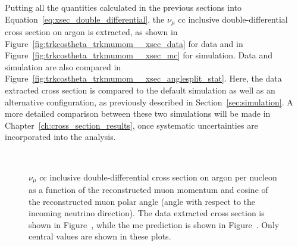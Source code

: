 Putting all the quantities calculated in the previous sections into Equation~\ref{eq:xsec_double_differential}, the $\nu_\mu$ \acrshort{cc} inclusive double-differential cross section on argon is extracted, as shown in Figure~\ref{fig:trkcostheta_trkmumom__xsec_data} for data and in Figure~\ref{fig:trkcostheta_trkmumom__xsec_mc} for simulation. Data and simulation are also compared in Figure~\ref{fig:trkcostheta_trkmumom__xsec_anglesplit_stat}. Here, the data extracted cross section is compared to the default \g simulation as well as an alternative \g configuration, as previously described in Section~\ref{sec:simulation}. A more detailed comparison between these two simulations will be made in Chapter~\ref{ch:cross_section_results}, once systematic uncertainties are incorporated into the analysis.

\begin{figure}[]
\centering
{} \qquad
{} \\
\caption[$\nu_\mu$ CC Double-Differential Cross Section (2D View)]{$\nu_\mu$ \acrshort{cc} inclusive double-differential cross section on argon per nucleon as a function of the reconstructed muon momentum and cosine of the reconstructed muon polar angle (angle with respect to the incoming neutrino direction). The data extracted cross section is shown in Figure~\protect{}, while the \acrshort{mc} prediction is shown in Figure~\protect{}. Only central values are shown in these plots.}
\label{fig:trkcostheta_trkmumom__xsec}
\end{figure}

